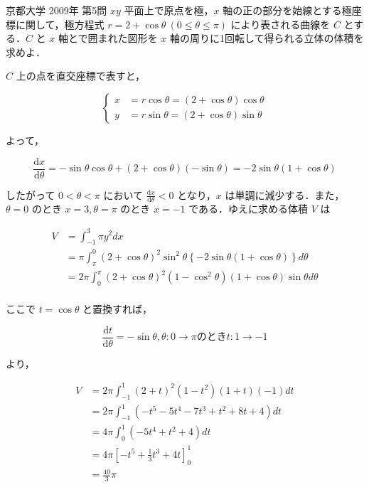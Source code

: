 \documentclass[a4paper]{ltjsarticle}
\begin{document}
\begin{itembox}[l]{京都大学 2009年 第5問}
    $xy$ 平面上で原点を極，$x$ 軸の正の部分を始線とする極座標に関して，極方程式 $r=2+\cos\theta\ (0\leq \theta\leq \pi)$ により表される曲線を $C$ とする．$C$ と $x$ 軸とで囲まれた図形を $x$ 軸の周りに1回転して得られる立体の体積を求めよ．
\end{itembox}

$C$ 上の点を直交座標で表すと，

\begin{equation*}
    \begin{cases}
        x & =r\cos\theta=(2+\cos\theta)\cos\theta \\
        y & =r\sin\theta=(2+\cos\theta)\sin\theta
    \end{cases}
\end{equation*}

よって，

\begin{equation*}
    \frac{\mathrm{d}x}{\mathrm{d}\theta}=-\sin\theta\cos\theta+(2+\cos\theta)(-\sin\theta)=-2\sin\theta(1+\cos\theta)
\end{equation*}

したがって $0< \theta< \pi$ において $\frac{\mathrm{d}x}{\mathrm{d}\theta}< 0$ となり，$x$ は単調に減少する．また，$\theta=0$ のとき $x=3,\theta=\pi$ のとき $x=-1$ である．ゆえに求める体積 $V$ は

\begin{align*}
    V & =\int_{-1}^3\pi y^2dx                                                                      \\
      & =\pi\int_\pi^0(2+\cos\theta)^2\sin^2\theta\left\{-2\sin\theta(1+\cos\theta)\right\}d\theta \\
      & =2\pi\int_0^\pi(2+\cos\theta)^2(1-\cos^2\theta)(1+\cos\theta)\sin\theta d\theta            \\
\end{align*}

ここで $t=\cos\theta$ と置換すれば，

\begin{equation*}
    \frac{\mathrm{d}t}{\mathrm{d}\theta}=-\sin\theta, \theta\colon 0\to\pi\text{のとき}t\colon 1\to-1
\end{equation*}

より，

\begin{align*}
    V & =2\pi\int_{-1}^1(2+t)^2(1-t^2)(1+t)(-1)dt    \\
      & =2\pi\int_{-1}^1(-t^5-5t^4-7t^3+t^2+8t+4)dt  \\
      & =4\pi\int_0^1(-5t^4+t^2+4)dt                 \\
      & =4\pi\left[-t^5+\frac{1}{3}t^3+4t\right]_0^1 \\
      & =\frac{40}{3}\pi
\end{align*}
\end{document}
